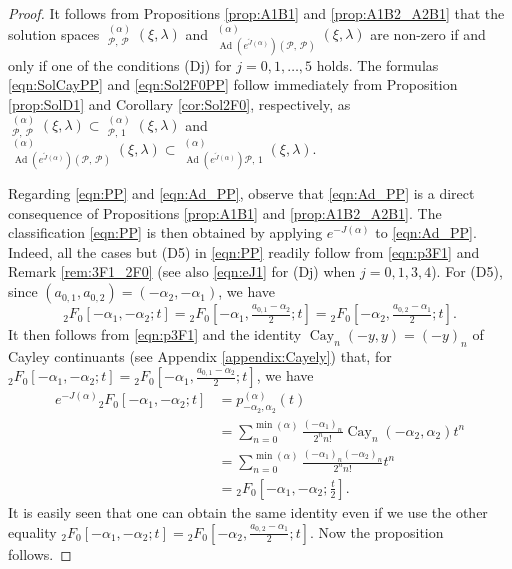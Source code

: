 \documentclass[a4paper,11pt,reqno]{amsart}
\newcommand{\calP}{\mathcal{P}}
\newcommand{\0}{{\bf 0}}
\newcommand{\1}{{\bf 1}}
\DeclareMathOperator{\Cay}{Cay}
\DeclareMathOperator{\Ad}{Ad}
\DeclareMathOperator{\Sol}{Sol}
\newcommand{\wJ}{\widetilde{J}}
\DeclareMathOperator{\wSol}{\widetilde{\Sol}}
\theoremstyle{plain}
\theoremstyle{definition}
\numberwithin{equation}{section}
\theoremstyle{definition}
\begin{document}
\begin{proof}
It follows from
Propositions \ref{prop:A1B1} and \ref{prop:A1B2_A2B1} 
that the solution spaces 
$\wSol_{\calP,\, \calP}^{(\alpha)}(\xi,\lambda)$
and
$\wSol_{\Ad(e^{\wJ(\alpha)})(\calP,\, \calP)}^{(\alpha)}
(\xi,\lambda)$
are non-zero if and only if  one of the conditions (Dj) for $j=0,1,\ldots, 5$ holds.
The formulas \eqref{eqn:SolCayPP} and \eqref{eqn:Sol2F0PP} follow
immediately from Proposition \ref{prop:SolD1} and Corollary \ref{cor:Sol2F0},
respectively, as 
$\wSol_{\calP,\, \calP}^{(\alpha)}(\xi,\lambda)
\subset 
\wSol_{\calP,\, 1}^{(\alpha)}(\xi,\lambda)$
and 
$\wSol_{\Ad(e^{\wJ(\alpha)})(\calP,\, \calP)}^{(\alpha)}
(\xi,\lambda)
\subset
\wSol_{\Ad(e^{\wJ(\alpha)}) \calP,\, 1}^{(\alpha)}(\xi,\lambda)$.

Regarding \eqref{eqn:PP} and \eqref{eqn:Ad_PP},
observe that 
\eqref{eqn:Ad_PP} is a direct consequence of 
Propositions \ref{prop:A1B1} and \ref{prop:A1B2_A2B1}.
The classification  \eqref{eqn:PP} is then obtained by
applying  $e^{-J(\alpha)}$ to \eqref{eqn:Ad_PP}.
Indeed, all the cases but (D5) in \eqref{eqn:PP} readily follow from
\eqref{eqn:p3F1} and Remark \ref{rem:3F1_2F0} (see also \eqref{eqn:eJ1} for (Dj) when $j=0,1,3,4$).
For (D5), since $(a_{0,1},a_{0,2})=(-\alpha_2,-\alpha_1)$, we have
\begin{equation*}
{}_2F_0[-\alpha_1, -\alpha_2;t]
={}_2F_0[-\alpha_1, \tfrac{a_{0,1}-\alpha_2}{2};t]
={}_2F_0[-\alpha_2, \tfrac{a_{0,2}-\alpha_1}{2};t].
\end{equation*}
It then follows from \eqref{eqn:p3F1}
and the identity 
$\Cay_n(-y,y)=(-y)_n$
of Cayley continuants
(see  Appendix \ref{appendix:Cayely})
that, 
for ${}_2F_0[-\alpha_1, -\alpha_2;t]
={}_2F_0[-\alpha_1, \tfrac{a_{0,1}-\alpha_2}{2};t]$, 
 we have 
\begin{align*}
e^{-J(\alpha)}{}_2F_0[-\alpha_1,-\alpha_2;t]
&=p_{-\alpha_2,\alpha_2}^{(\alpha)}(t)\\
&=\sum_{n=0}^{\min(\alpha)} 
\frac{(-\alpha_1)_n}{2^n n! }\Cay_n(-\alpha_2,\alpha_2)t^n\\
&=\sum_{n=0}^{\min(\alpha)} 
\frac{(-\alpha_1)_n(-\alpha_2)_n}{2^n n! }t^n\\
&={}_2F_0[-\alpha_1,-\alpha_2;\tfrac{t}{2}].
\end{align*}
It is easily seen that one can obtain the same identity even if 
we use the other equality
${}_2F_0[-\alpha_1, -\alpha_2;t]
={}_2F_0[-\alpha_2, \tfrac{a_{0,2}-\alpha_1}{2};t]$.
Now the proposition follows.
\end{proof}
\end{document}
